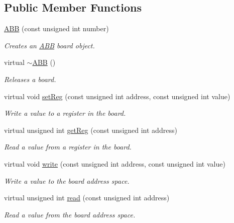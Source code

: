\subsection*{Public Member Functions}
\begin{CompactItemize}
\item 
\hyperlink{classmprace_1_1ABB_a0}{ABB} (const unsigned int number)
\begin{CompactList}\small\item\em Creates an \hyperlink{classmprace_1_1ABB}{ABB} board object. \item\end{CompactList}\item 
virtual \hyperlink{classmprace_1_1ABB_a1}{$\sim$ABB} ()
\begin{CompactList}\small\item\em Releases a board. \item\end{CompactList}\item 
virtual void \hyperlink{classmprace_1_1ABB_a2}{set\-Reg} (const unsigned int address, const unsigned int value)
\begin{CompactList}\small\item\em Write a value to a register in the board. \item\end{CompactList}\item 
virtual unsigned int \hyperlink{classmprace_1_1ABB_a3}{get\-Reg} (const unsigned int address)
\begin{CompactList}\small\item\em Read a value from a register in the board. \item\end{CompactList}\item 
virtual void \hyperlink{classmprace_1_1ABB_a4}{write} (const unsigned int address, const unsigned int value)
\begin{CompactList}\small\item\em Write a value to the board address space. \item\end{CompactList}\item 
virtual unsigned int \hyperlink{classmprace_1_1ABB_a5}{read} (const unsigned int address)
\begin{CompactList}\small\item\em Read a value from the board address space. \item\end{CompactList}\item 

\end{CompactItemize}
